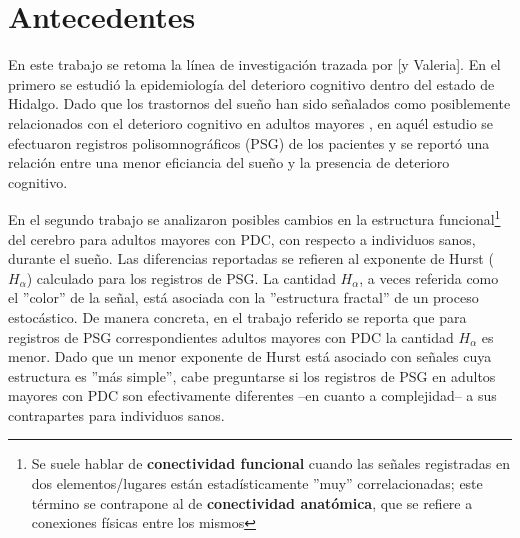 \documentclass[12pt,a4paper]{mitthesis}
\begin{document}
\newpage


\thispagestyle{empty}

\tableofcontents
\newpage


\setcounter{page}{1}

\chapter{Antecedentes}

En este trabajo se retoma la l\'inea de investigaci\'on trazada por \cite{VazquezTagle16} [y
Valeria]. 
En el primero se estudi\'o la epidemiolog\'ia del deterioro cognitivo dentro del estado de
Hidalgo. Dado que los trastornos del sue\~no han sido se\~nalados como posiblemente relacionados
con el deterioro cognitivo en adultos mayores \cite{Amer13,Miyata13,Potvin12}, en aqu\'el estudio
se efectuaron registros polisomnogr\'aficos (PSG) de los pacientes y se report\'o una relaci\'on
entre una menor eficiancia del sue\~no y la presencia de deterioro cognitivo.

En el segundo trabajo se analizaron posibles cambios en la estructura funcional\footnote{Se suele 
hablar de \textbf{conectividad funcional} cuando las se\~nales registradas en dos elementos/lugares 
est\'an estad\'isticamente ''muy'' correlacionadas; este t\'ermino se contrapone al de
\textbf{conectividad anat\'omica}, que se refiere a conexiones f\'isicas entre los mismos} del 
cerebro para adultos mayores con PDC, con respecto a individuos sanos, durante el sue\~no.
Las diferencias reportadas se refieren al exponente de Hurst ($H_\alpha$) calculado para los 
registros de PSG.
La cantidad $H_\alpha$, a veces referida como el ''color'' de la se\~nal, est\'a asociada con la
''estructura fractal'' de un proceso estoc\'astico. De manera concreta, en el trabajo referido
se reporta que para registros de PSG correspondientes adultos mayores con 
PDC la cantidad $H_\alpha$ es menor. Dado que un menor exponente de Hurst est\'a 
asociado con se\~nales cuya estructura es ''m\'as simple'', cabe preguntarse si 
los registros de PSG en adultos mayores con PDC son efectivamente diferentes --en cuanto a 
complejidad-- a sus
contrapartes para individuos sanos. 
\end{document}
